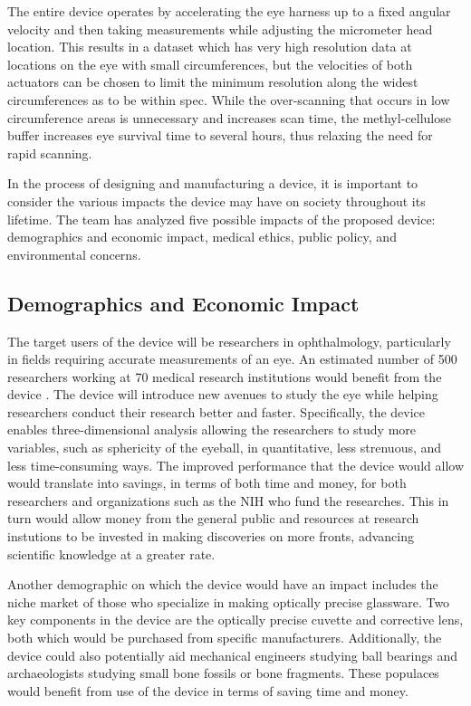 \documentclass{article}
\begin{document}
The entire device operates by accelerating the eye harness up to a fixed angular velocity and then taking measurements while adjusting the micrometer head location. This results in a dataset which has very high resolution data at locations on the eye with small circumferences, but the velocities of both actuators can be chosen to limit the minimum resolution along the widest circumferences as to be within spec. While the over-scanning that occurs in low circumference areas is unnecessary and increases scan time, the methyl-cellulose buffer increases eye survival time to several hours, thus relaxing the need for rapid scanning.
 
In the process of designing and manufacturing a device, it is important to consider the various impacts the device may have on society throughout its lifetime. The team has analyzed five possible impacts of the proposed device: demographics and economic impact, medical ethics, public policy, and environmental concerns. 
 
 
\subsection{Demographics and Economic Impact}
\label{sec:Demographics}
 
The target users of the device will be researchers in ophthalmology, particularly in
fields requiring accurate measurements of an eye. An estimated number
of 500 researchers working at 70 medical research institutions would
benefit from the device \cite{Nickerson}. The device will introduce new avenues to
study the eye while helping researchers conduct their research better
and faster. Specifically, the device enables three-dimensional
analysis allowing the researchers to study more variables, such as
sphericity of the eyeball, in quantitative, less strenuous, and less
time-consuming ways. The improved performance that the device would
allow would translate into savings, in terms of both time and money,
for both researchers and organizations such as the NIH who fund the
researches. This in turn would allow money from the general public and
resources at research instutions to be invested in making discoveries
on more fronts, advancing scientific knowledge at a greater
rate. 
 
Another demographic on which the device would have an impact includes
the niche market of those who specialize in making optically precise
glassware. Two key components in the device are the optically precise
cuvette and corrective lens, both which would be purchased from
specific manufacturers. Additionally, the device could also
potentially aid mechanical engineers studying ball bearings and
archaeologists studying small bone fossils or bone fragments. These
populaces would  benefit from use of the device in terms of saving time and money. 
\end{document}
